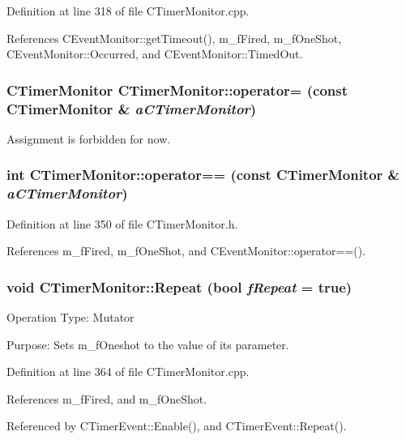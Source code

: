 Definition at line 318 of file CTimer\-Monitor.cpp.

References CEvent\-Monitor::get\-Timeout(), m\_\-f\-Fired, m\_\-f\-One\-Shot, CEvent\-Monitor::Occurred, and CEvent\-Monitor::Timed\-Out.
\subsubsection{\setlength{\rightskip}{0pt plus 5cm}CTimer\-Monitor CTimer\-Monitor::operator= (const CTimer\-Monitor \& {\em a\-CTimer\-Monitor})\hspace{0.3cm}{\tt  [private]}}\label{classCTimerMonitor_c1}


Assignment is forbidden for now.

\subsubsection{\setlength{\rightskip}{0pt plus 5cm}int CTimer\-Monitor::operator== (const CTimer\-Monitor \& {\em a\-CTimer\-Monitor})\hspace{0.3cm}{\tt  [inline]}}\label{classCTimerMonitor_a4}




Definition at line 350 of file CTimer\-Monitor.h.

References m\_\-f\-Fired, m\_\-f\-One\-Shot, and CEvent\-Monitor::operator==().
\subsubsection{\setlength{\rightskip}{0pt plus 5cm}void CTimer\-Monitor::Repeat (bool {\em f\-Repeat} = true)}\label{classCTimerMonitor_a8}


Operation Type: Mutator

Purpose: Sets m\_\-f\-Oneshot to the value of its parameter. 

Definition at line 364 of file CTimer\-Monitor.cpp.

References m\_\-f\-Fired, and m\_\-f\-One\-Shot.

Referenced by CTimer\-Event::Enable(), and CTimer\-Event::Repeat().
